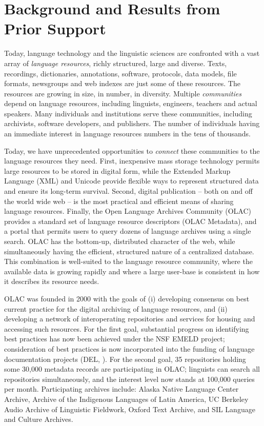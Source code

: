 \section{Background and Results from Prior Support}


Today, language technology and the linguistic sciences are confronted
with a vast array of \emph{language resources}, richly structured,
large and diverse.  Texts, recordings, dictionaries, annotations,
software, protocols, data models, file formats, newsgroups and web
indexes are just some of these resources.  The resources are growing
in size, in number, in diversity.  Multiple \emph{communities} depend
on language resources, including linguists, engineers, teachers and
actual speakers.  Many individuals and institutions serve these
communities, including archivists, software developers, and
publishers.
The number of individuals having an immediate interest in language
resources numbers in the tens of thousands.


Today, we have unprecedented opportunities to \emph{connect} these
communities to the language resources they need.  First, inexpensive
mass storage technology permits large resources to be stored in
digital form, while the Extended Markup Language (XML) and Unicode
provide flexible ways to represent structured data and ensure its
long-term survival.  Second, digital publication -- both on and off
the world wide web -- is the most practical and efficient means of
sharing language resources.  Finally, the Open Language Archives
Community (OLAC) provides a standard set of language resource
descriptors (OLAC Metadata), and a portal that permits users to query
dozens of language archives using a single search.  OLAC has the
bottom-up, distributed character of the web, while simultaneously
having the efficient, structured nature of a centralized database.
This combination is well-suited to the language resource community,
where the available data is growing rapidly and where a large
user-base is consistent in how it describes its resource needs.


OLAC was founded in 2000 with the goals of (i) developing consensus on
best current practice for the digital archiving of language resources,
and (ii) developing a network of interoperating repositories and
services for housing and accessing such resources.  For the first
goal, substantial progress on identifying best practices has now been
achieved under the NSF EMELD project; consideration of best practices
is now incorporated into the funding of language documentation
projects (DEL, \citet{BirdSimons03language}).  For the second goal,
35 repositories holding some 30,000 metadata records are
participating in OLAC; linguists can search all repositories
simultaneously, and the interest level now stands
at 100,000 queries per month.  Participating archives include:
Alaska Native Language Center Archive,
Archive of the Indigenous Languages of Latin America,
UC Berkeley Audio Archive of Linguistic Fieldwork,
Oxford Text Archive, and
SIL Language and Culture Archives.

